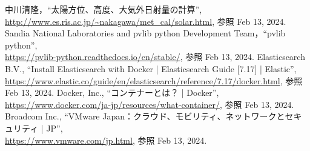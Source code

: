 \begin{thebibliography}{99}

中川清隆，“太陽方位、高度、大気外日射量の計算”,\\ \url{http://www.es.ris.ac.jp/~nakagawa/met_cal/solar.html}, 参照 Feb 13, 2024.
Sandia National Laboratories and pvlib python Development Team，“pvlib python”,\\ \url{https://pvlib-python.readthedocs.io/en/stable/}, 参照 Feb 13, 2024.
Elasticsearch B.V., “Install Elasticsearch with Docker | Elasticsearch Guide [7.17] | Elastic”,\\ \url{https://www.elastic.co/guide/en/elasticsearch/reference/7.17/docker.html}, 参照 Feb 13, 2024.
Docker, Inc., “コンテナーとは？ | Docker”,\\ \url{https://www.docker.com/ja-jp/resources/what-container/}, 参照 Feb 13, 2024.
Broadcom Inc., “VMware Japan：クラウド、モビリティ、ネットワークとセキュリティ | JP”,\\ \url{https://www.vmware.com/jp.html}, 参照 Feb 13, 2024.
\end{thebibliography}
